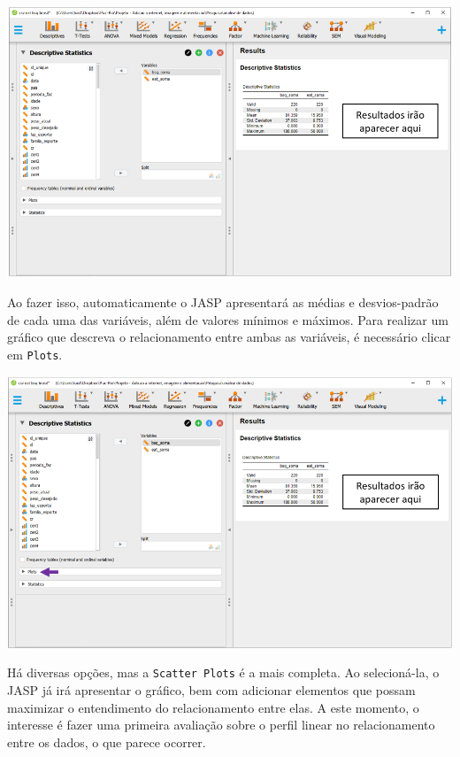 \documentclass[
]{book}
\begin{document}
\includegraphics{./img/cap_reg_descritivo.png}

Ao fazer isso, automaticamente o JASP apresentará as médias e desvios-padrão de cada uma das variáveis, além de valores mínimos e máximos. Para realizar um gráfico que descreva o relacionamento entre ambas as variáveis, é necessário clicar em \texttt{Plots}.

\includegraphics{./img/cap_reg_plot.png}

Há diversas opções, mas a \texttt{Scatter\ Plots} é a mais completa. Ao selecioná-la, o JASP já irá apresentar o gráfico, bem com adicionar elementos que possam maximizar o entendimento do relacionamento entre elas. A este momento, o interesse é fazer uma primeira avaliação sobre o perfil linear no relacionamento entre os dados, o que parece ocorrer.
\end{document}
